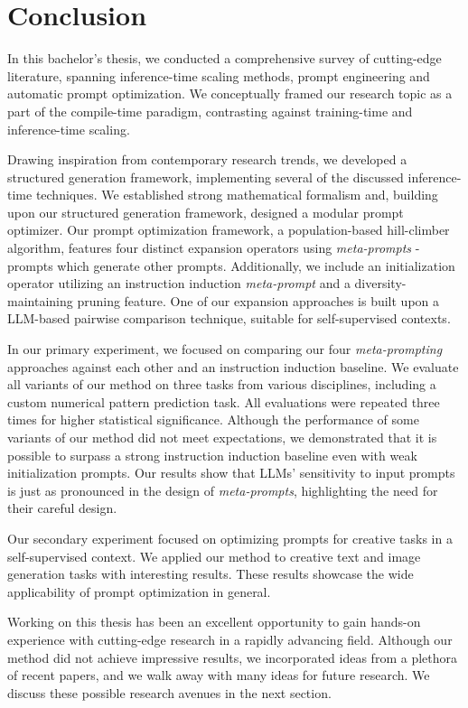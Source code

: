 \section{Conclusion}
In this bachelor's thesis, we conducted a comprehensive survey of cutting-edge literature, spanning 
inference-time scaling methods, prompt engineering and automatic prompt optimization.
We conceptually framed our research topic as a part of the compile-time paradigm, contrasting against training-time and inference-time scaling.

Drawing inspiration from contemporary research trends, we developed a structured generation framework, implementing several of the discussed inference-time techniques.
We established strong mathematical formalism and, building upon our structured generation framework, designed a modular prompt optimizer.
Our prompt optimization framework, a population-based hill-climber algorithm, features four distinct expansion operators using \textit{meta-prompts} - prompts which generate other prompts.
Additionally, we include an initialization operator utilizing an instruction induction \textit{meta-prompt} and a diversity-maintaining pruning feature.
One of our expansion approaches is built upon a LLM-based pairwise comparison technique, suitable for self-supervised contexts.

In our primary experiment, we focused on comparing our four \textit{meta-prompting} approaches against each other and an instruction induction baseline.
We evaluate all variants of our method on three tasks from various disciplines, including a custom numerical pattern prediction task.
All evaluations were repeated three times for higher statistical significance.
Although the performance of some variants of our method did not meet expectations, we demonstrated that it is possible to surpass a strong instruction induction baseline even with weak initialization prompts. 
Our results show that LLMs' sensitivity to input prompts is just as pronounced in the design of \textit{meta-prompts}, highlighting the need for their careful design.

Our secondary experiment focused on optimizing prompts for creative tasks in a self-supervised context.
We applied our method to creative text and image generation tasks with interesting results. 
These results showcase the wide applicability of prompt optimization in general.

Working on this thesis has been an excellent opportunity to gain hands-on experience with cutting-edge research in a rapidly advancing field.
Although our method did not achieve impressive results, we incorporated ideas from a plethora of recent papers, 
and we walk away with many ideas for future research.
We discuss these possible research avenues in the next section.

